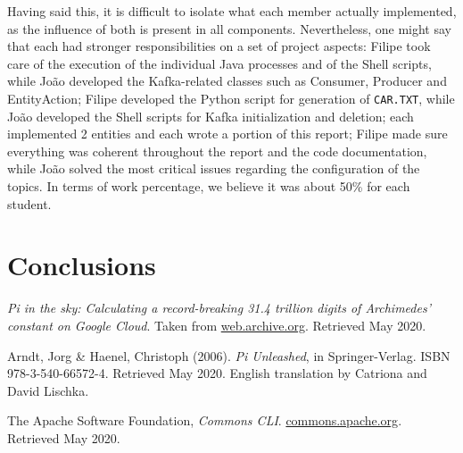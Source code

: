 \documentclass[12pt]{article}
\begin{document}
Having said this, it is difficult to isolate what each member actually implemented, as the influence of both is present in all components.
Nevertheless, one might say that each had stronger responsibilities on a set of project aspects:
Filipe took care of the execution of the individual Java processes and of the Shell scripts, while João developed the Kafka-related classes such as Consumer,
Producer and EntityAction; Filipe developed the Python script for generation of \texttt{CAR.TXT}, while João developed the Shell scripts for Kafka initialization
and deletion; each implemented 2 entities and each wrote a portion of this report; Filipe made sure everything was coherent throughout the report and the code
documentation, while João solved the most critical issues regarding the configuration of the topics.
In terms of work percentage, we believe it was about 50\% for each student.

\newpage
\section*{Conclusions} \label{conclusions} %

\begin{thebibliography}{9} %
  

    \textit{Pi in the sky: Calculating a record-breaking 31.4 trillion digits of Archimedes' constant on Google Cloud}.
    Taken from \href{https://web.archive.org/web/20191019023120/https://cloud.google.com/blog/products/compute/calculating-31-4-trillion-digits-of-archimedes-constant-on-google-cloud}{web.archive.org}.
    Retrieved May 2020.

    Arndt, Jorg \& Haenel, Christoph (2006).
    \textit{Pi Unleashed}, in Springer-Verlag.
    ISBN 978-3-540-66572-4.
    Retrieved May 2020.
    English translation by Catriona and David Lischka.

    The Apache Software Foundation,
    \textit{Commons CLI}.
    \href{https://commons.apache.org/proper/commons-cli/}{commons.apache.org}.
    Retrieved May 2020.


\end{thebibliography}

\clearpage
\end{document}
